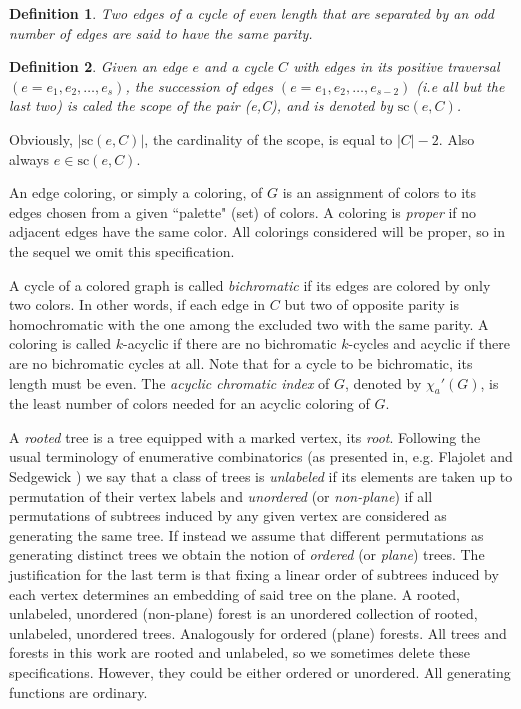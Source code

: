 \documentclass{amsart}
\theoremstyle{plain}
\newtheorem{definition}{Definition}
\newcommand{\x}{\chi_a}
\newcommand{\sco}{\mathrm{sc}}
\begin{document}
\begin{definition}\label{def:parity}
	Two edges  of a cycle of even length that  are separated by an odd number of edges  are said to have the same {\em parity}. 
\end{definition}

\begin{definition}
Given an edge $e$ and a cycle $C$ with edges in its positive traversal $(e=e_1, e_2, \ldots, e_s)$, the succession  of edges $(e=e_1, e_2, \ldots, e_{s-2})$ (i.e all but the last two) is caled the scope of the pair (e,C), and is denoted by $\sco(e,C)$. 	
\end{definition}
Obviously,  $|\sco(e,C)|$, the cardinality of the scope, is equal to   $|C|-2$.	Also always $e \in \sco(e,C)$.



An edge coloring, or simply a coloring, of $G$ is an assignment of colors to its edges chosen from a given ``palette" (set)  of colors.  
A coloring is  \emph{proper} if no adjacent edges have the same color.  All colorings considered will be proper, so in the sequel we omit this specification.




A cycle of a colored graph is called {\em bichromatic} if its edges  are colored
 by only two colors. In other words, if each edge in $C$ but two of opposite parity is homochromatic with the one among the excluded two with the same parity.  A  coloring is called $k$-acyclic if there are no bichromatic $k$-cycles and acyclic if there are no bichromatic cycles at all. Note that for a cycle to be bichromatic, its length must be even. The \emph{acyclic chromatic index} of $G$, denoted by $\x'(G)$, is the least number of colors needed for an acyclic coloring of $G$. 

A {\em rooted} tree is a tree equipped with a marked vertex, its {\em root}.
Following the usual terminology of enumerative combinatorics (as presented in,
e.g. Flajolet and Sedgewick \cite{Flajolet:2009:AC:1506267}) we say that a class of trees is {\em
unlabeled} if its elements are taken up to permutation of their vertex labels
and {\em unordered} (or {\em non-plane}) if all permutations of subtrees induced by
any given vertex are considered as generating the same tree. If instead we
assume that  different permutations as generating distinct trees we obtain the notion
of {\em ordered} (or {\em plane}) trees. The justification for the last
term is  that fixing a linear order of subtrees induced by each vertex
determines an embedding of said tree on the plane.
A rooted, unlabeled, unordered (non-plane) forest is an unordered
collection of rooted, unlabeled, unordered trees. Analogously for ordered (plane) forests. %
All trees and forests in this work are rooted and unlabeled, so we sometimes delete these specifications. However, they could be either ordered or unordered. All generating functions are ordinary.
\end{document}

